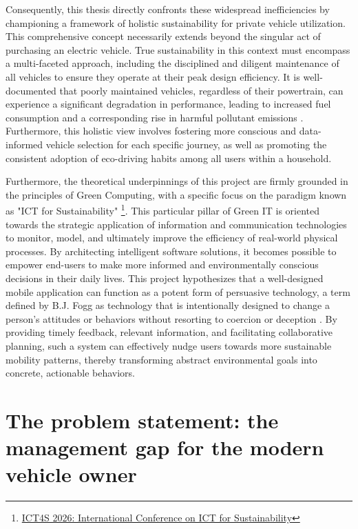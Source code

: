 \textgap

Consequently, this thesis directly confronts these widespread inefficiencies by championing a framework of holistic sustainability for private vehicle utilization. This comprehensive concept necessarily extends beyond the singular act of purchasing an electric vehicle. True sustainability in this context must encompass a multi-faceted approach, including the disciplined and diligent maintenance of all vehicles to ensure they operate at their peak design efficiency. It is well-documented that poorly maintained vehicles, regardless of their powertrain, can experience a significant degradation in performance, leading to increased fuel consumption and a corresponding rise in harmful pollutant emissions \cite{iea2021fuel}. Furthermore, this holistic view involves fostering more conscious and data-informed vehicle selection for each specific journey, as well as promoting the consistent adoption of eco-driving habits among all users within a household.

\textgap

Furthermore, the theoretical underpinnings of this project are firmly grounded in the principles of Green Computing, with a specific focus on the paradigm known as "ICT for Sustainability" \footnote{\href{https://conf.researchr.org/home/ict4s-2026}{ICT4S 2026: International Conference on ICT for Sustainability}}. This particular pillar of Green IT is oriented towards the strategic application of information and communication technologies to monitor, model, and ultimately improve the efficiency of real-world physical processes. By architecting intelligent software solutions, it becomes possible to empower end-users to make more informed and environmentally conscious decisions in their daily lives. This project hypothesizes that a well-designed mobile application can function as a potent form of persuasive technology, a term defined by B.J. Fogg as technology that is intentionally designed to change a person's attitudes or behaviors without resorting to coercion or deception \cite{fogg2002persuasive}. By providing timely feedback, relevant information, and facilitating collaborative planning, such a system can effectively nudge users towards more sustainable mobility patterns, thereby transforming abstract environmental goals into concrete, actionable behaviors.

\section{The problem statement: the management gap for the modern vehicle owner}

